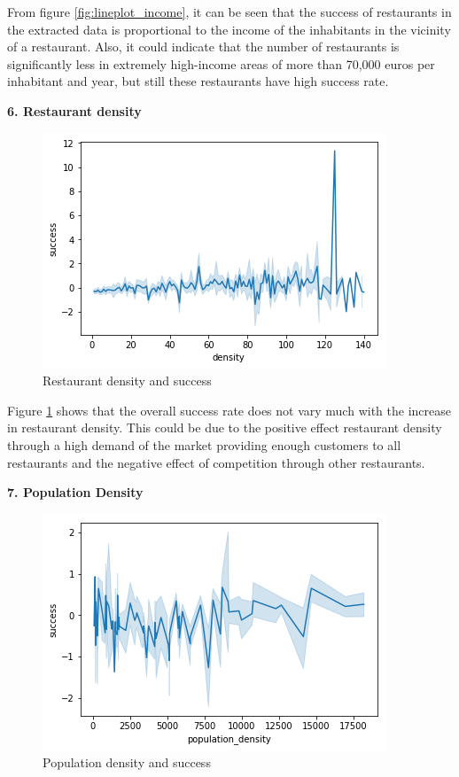 \documentclass[a4paper, 11pt, oneside]{Thesis}  %
\begin{document}
From figure \ref{fig:lineplot_income}, it can be seen that the success of restaurants in the extracted data is proportional to the income of the inhabitants in the vicinity of a restaurant. Also, it could indicate that the number of restaurants is significantly less in extremely high-income areas of more than 70,000 euros per inhabitant and year, but still these restaurants have high success rate.

\textbf{6.	Restaurant density}
 
\begin{figure}[h]
\includegraphics[scale=0.7]{Figures/Exploratory/lineplot_restaurant_densities.png}
\centering
\caption{Restaurant density and success}
\label{fig:lineplot_restaurant_densities}
\end{figure}

Figure \ref{fig:lineplot_restaurant_densities} shows that the overall success rate does not vary much with the increase in restaurant density. This could be due to the positive effect restaurant density through a high demand of the market providing enough customers to all restaurants and the negative effect of competition through other restaurants.

\textbf{7.	Population Density}
 
\begin{figure}[h]
\includegraphics[scale=0.7]{Figures/Exploratory/lineplot_population_density.png}
\centering
\caption{Population density and success}
\label{fig:lineplot_population_density}
\end{figure}
\end{document}
